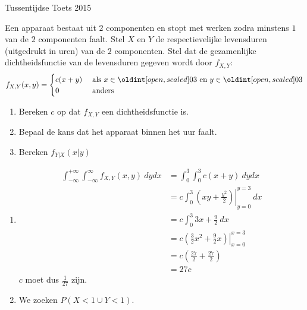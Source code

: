 \documentclass[main.tex]{subfiles}
\begin{document}
\begin{examenvraag}{Tussentijdse Toets 2015}
  \begin{ex-vraag}
    Een apparaat bestaat uit $2$ componenten en stopt met werken zodra minstens $1$ van de $2$ componenten faalt.
    Stel $X$ en $Y$ de respectievelijke levensduren (uitgedrukt in uren) van de $2$ componenten.
    Stel dat de gezamenlijke dichtheidsfunctie van de levensduren gegeven wordt door $f_{X,Y}$:
    \[
    f_{X,Y}(x,y) = 
    \begin{cases}
      c(x+y) & \text{ als } x\in\interval[open]{0}{3} \text{ en } y \in\interval[open]{0}{3}\\
      0 & \text{ anders}
    \end{cases}
    \]
    \begin{enumerate}
    \item Bereken $c$ op dat $f_{X,Y}$ een dichtheidsfunctie is.
    \item Bepaal de kans dat het apparaat binnen het uur faalt.
    \item Bereken $f_{Y|X}(x|y)$
    \end{enumerate}
  \end{ex-vraag}

  \begin{ex-antwoord}
    \begin{enumerate}
    \item {}
      \begin{align*}
        \int_{-\infty}^{+\infty}\int_{-\infty}^{\infty}f_{X,Y}(x,y)\ dy dx
        &= \int_{0}^{3}\int_{0}^{3}c(x+y)\ dy dx\\
        &= c\int_{0}^{3}\left.\left(xy + \frac{y^{2}}{2}\right)\right|_{y=0}^{y=3}\ dx\\
        &= c\int_{0}^{3}3x + \frac{9}{2}\ dx\\
        &= c\left.\left(\frac{3}{2}x^{2}+\frac{9}{2}x\right)\right|_{x=0}^{x=3}\\
        &= c\left(\frac{27}{2} + \frac{27}{2}\right)\\
        &= 27 c
      \end{align*}
      $c$ moet dus $\frac{1}{27}$ zijn.

    \item We zoeken $P(X < 1 \cup Y < 1)$.
      \begin{figure}[H]
        \centering
\end{figure}
\end{enumerate}
\end{ex-antwoord}
\end{examenvraag}
\end{document}

